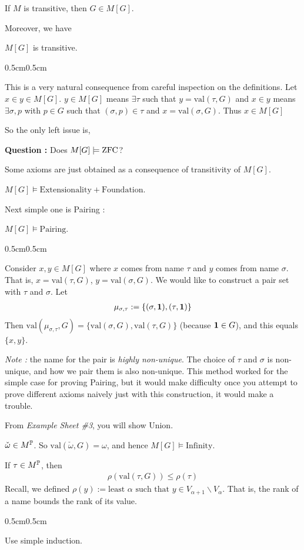 \documentclass[12pt,a4paper]{article}
\newenvironment{proof}
{\begin{changemargin}{0.5cm}{0.5cm} 
	}%
	{\end{changemargin}
}
\newenvironment{p}
{\begin{proof} 
	}%
	{\end{proof}
}
\begin{document}
\corr If $M$ is transitive, then $G\in M[G]$.
\s

Moreover, we have
\s

\lem $M[G]$ is transitive.
\begin{p}
\pf This is a very natural consequence from careful inspection on the definitions. Let $x\in y\in M[G]$. $y\in M[G]$ means $\exists \tau$ such that $y= \text{val}(\tau, G)$ and $x\in y$ means $\exists \sigma, p$ with $p\in G$ such that $(\sigma, p)\in \tau$ and $x= \text{val}(\sigma, G)$. Thus $x\in M[G]$

\eop 
\end{p}
\s

So the only left issue is, 

\textbf{Question :} Does $M[G] \models \text{ZFC}$?
\s

Some axioms are just obtained as a consequence of transitivity of $M[G]$.
\s

\corr $M[G] \models \text{Extensionality} + \text{Foundation}$.
\s

Next simple one is Pairing : 
\s

\prop $M[G] \models \text{Pairing}$.
\begin{p}
\pf Consider $x, y\in M[G]$ where $x$ comes from name $\tau$ and $y$ comes from name $\sigma$. That is, $x= \text{val}(\tau, G)$, $y = \text{val}(\sigma, G)$. We would like to construct a pair set with $\tau$ and $\sigma$. Let
\begin{align*}
\mu_{\sigma, \tau} := \{(\sigma, \bm{1}), (\tau, \bm{1})\}
\end{align*}
Then $\text{val}(\mu_{\sigma, \tau}, G) = \{\text{val}(\sigma, G), \text{val}(\tau, G)\}$ (because $\bm{1} \in G$), and this equals $\{x,y\}$.

\eop
\end{p}

\s

\emph{Note :} the name for the pair is \emph{highly non-unique}. The choice of $\tau$ and $\sigma$ is non-unique, and how we pair them is also non-unique. This method worked for the simple case for proving Pairing, but it would make difficulty once you attempt to prove different axioms naively just with this construction, it would make a trouble. 
\s

From \emph{Example Sheet \#3}, you will show Union.
\s

\corr $\check{\omega} \in M^{\mathbb{P}}$. So $\text{val}(\check{\omega}, G) =\omega$, and hence $M[G] \models \text{Infinity}$.
\s

\lem If $\tau \in M^{\mathbb{P}}$, then
\begin{align*}
\rho(\text{val}(\tau, G)) \leq \rho(\tau)
\end{align*}
Recall, we defined $\rho(y) :=\text{least } \alpha \text{ such that } y \in V_{\alpha +1}\backslash V_{\alpha}$. That is, the rank of a name bounds the rank of its value.
\begin{p}
\pf Use simple induction.
\end{p}
\s
\end{document}
